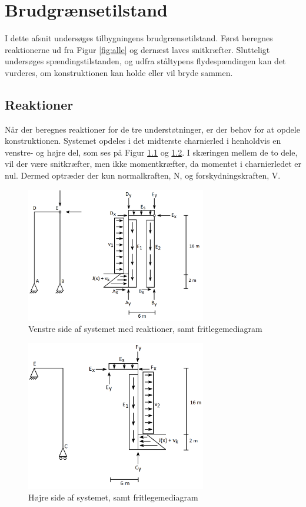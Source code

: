 \chapter{Brudgrænsetilstand}

I dette afsnit undersøges tilbygningens brudgrænsetilstand. Først beregnes reaktionerne ud fra Figur \ref{fig:alle} og dernæst laves snitkræfter. Slutteligt undersøges spændingstilstanden, og udfra ståltypens flydespændingen kan det vurderes, om konstruktionen kan holde eller vil bryde sammen.   

\section{Reaktioner}
Når der beregnes reaktioner for de tre understøtninger, er der behov for at opdele konstruktionen. Systemet opdeles i det midterste charnierled i henholdvis en venstre- og højre del, som ses på Figur \ref{fig:opdelingv} og \ref{fig:opdelingh}. I skæringen mellem de to dele, vil der være snitkræfter, men ikke momentkræfter, da momentet i charnierledet er nul. Dermed optræder der kun normalkraften, N, og forskydningskraften, V.

\begin{figure}[H]
	\centering
	\includegraphics[width=0.7\textwidth]{billeder/venstre.png}
	\caption{Venstre side af systemet med reaktioner, samt fritlegemediagram}
	\label{fig:opdelingv}
\end{figure}

\begin{figure}[H]
	\centering
	\includegraphics[width=0.7\textwidth]{billeder/hojre.png}
	\caption{Højre side af systemet, samt fritlegemediagram}
	\label{fig:opdelingh}
\end{figure}

